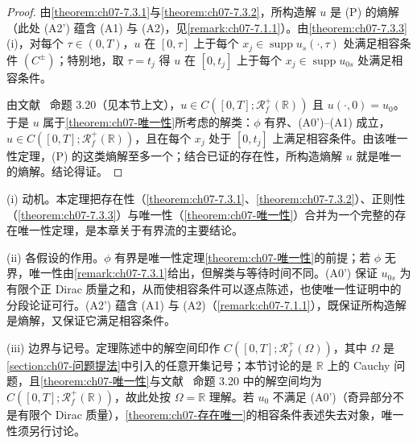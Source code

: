 \documentclass[../../main.tex]{subfiles}%
\begin{document}
\begin{proof}
由\cref{theorem:ch07-7.3.1}与\cref{theorem:ch07-7.3.2}，所构造解 $u$ 是 (P) 的熵解（此处 (A2') 蕴含 (A1) 与 (A2)，见\cref{remark:ch07-7.1.1}）。由\cref{theorem:ch07-7.3.3}(i)，对每个 $\tau\in(0,T)$，$u$ 在 $[0,\tau]$ 上于每个 $x_j\in\operatorname{supp}u_s(\cdot,\tau)$ 处满足相容条件 $(C^\pm)$；特别地，取 $\tau=t_j$ 得 $u$ 在 $[0,t_j]$ 上于每个 $x_j\in\operatorname{supp}u_{0s}$ 处满足相容条件。

由文献~\cite{ref17} 命题 3.20（见本节上文），$u\in C([0,T];\mathscr{R}_f^+(\mathbb{R}))$ 且 $u(\cdot,0)=u_0$。于是 $u$ 属于\cref{theorem:ch07-唯一性}所考虑的解类：$\phi$ 有界、(A0')--(A1) 成立，$u\in C([0,T];\mathscr{R}_f^+(\mathbb{R}))$，且在每个 $x_j$ 处于 $[0,t_j]$ 上满足相容条件。由该唯一性定理，(P) 的这类熵解至多一个；结合已证的存在性，所构造熵解 $u$ 就是唯一的熵解。结论得证。
\end{proof}

\begin{remark}\label{remark:ch07-存在唯一动机}
(i) 动机。本定理把存在性（\cref{theorem:ch07-7.3.1}、\cref{theorem:ch07-7.3.2}）、正则性（\cref{theorem:ch07-7.3.3}）与唯一性（\cref{theorem:ch07-唯一性}）合并为一个完整的存在唯一性定理，是本章关于有界流的主要结论。

(ii) 各假设的作用。$\phi$ 有界是唯一性定理\cref{theorem:ch07-唯一性}的前提；若 $\phi$ 无界，唯一性由\cref{remark:ch07-7.3.1}给出，但解类与等待时间不同。(A0') 保证 $u_{0s}$ 为有限个正 Dirac 质量之和，从而使相容条件可以逐点陈述，也使唯一性证明中的分段论证可行。(A2') 蕴含 (A1) 与 (A2)（\cref{remark:ch07-7.1.1}），既保证所构造解是熵解，又保证它满足相容条件。

(iii) 边界与记号。定理陈述中的解空间印作 $C([0,T];\mathscr{R}_f^+(\Omega))$，其中 $\Omega$ 是\cref{section:ch07-问题提法}中引入的任意开集记号；本节讨论的是 $\mathbb{R}$ 上的 Cauchy 问题，且\cref{theorem:ch07-唯一性}与文献~\cite{ref17} 命题 3.20 中的解空间均为 $C([0,T];\mathscr{R}_f^+(\mathbb{R}))$，故此处按 $\Omega=\mathbb{R}$ 理解。若 $u_0$ 不满足 (A0')（奇异部分不是有限个 Dirac 质量），\cref{theorem:ch07-存在唯一}的相容条件表述失去对象，唯一性须另行讨论。
\end{remark}
\end{document}
